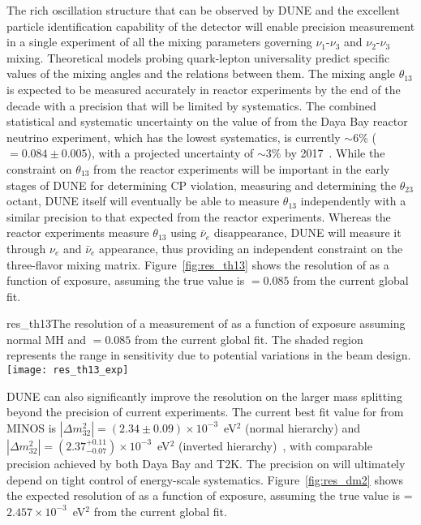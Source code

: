 The rich oscillation structure that can be observed by DUNE and the
excellent particle identification capability of the detector
will enable precision measurement  in a single experiment of all the mixing parameters
governing $\nu_1$-$\nu_3$ and $\nu_2$-$\nu_3$ mixing. Theoretical models probing quark-lepton
universality predict specific values of the mixing angles and the
relations between them. The
mixing angle $\theta_{13}$ is
expected to be measured accurately in reactor experiments by the end
of the decade with a precision that will be limited by
systematics. 
The combined statistical and systematic uncertainty on the value of  
from the Daya Bay reactor neutrino experiment, which has
the lowest systematics, is currently $\sim6$\% ( $= 0.084\pm0.005$),
with a projected uncertainty of $\sim$3\% by 2017~\cite{Zhang:2015fya}.
While the constraint on $\theta_{13}$ from the reactor experiments will be
important in the
early stages of DUNE for determining CP violation, measuring
\deltacp and determining the $\theta_{23}$ octant, 
DUNE itself will eventually be able to measure
$\theta_{13}$ independently with a similar precision to that expected from the reactor experiments. 
Whereas the reactor experiments measure $\theta_{13}$ using $\bar{\nu}_e$
disappearance, DUNE will measure it through $\nu_e$ and
$\bar{\nu}_e$ appearance, thus providing an independent constraint on
the three-flavor mixing matrix.   Figure~\ref{fig:res_th13} shows the resolution of  as a function of exposure, assuming the true value is $ = 0.085$ from the current global fit.

\begin{cdrfigure}{res_th13}{The resolution of a measurement of  as a function of exposure assuming normal MH and $ = 0.085$ from the current global fit. The shaded region represents the range in sensitivity due to potential variations in the beam design.  }
 \texttt{[image: res\_th13\_exp]}
\end{cdrfigure}

DUNE can also significantly improve the
resolution on the larger mass splitting beyond the precision of current experiments.  The current best fit value for 
 from MINOS is $|\Delta m^2_{32}| = (2.34\pm0.09)\times10^{-3}$~eV$^2$ (normal hierarchy) and $|\Delta m^2_{32}| = (2.37^{+0.11}_{-0.07})\times10^{-3}$~eV$^2$ (inverted hierarchy)~\cite{Sousa:2015bxa}, with comparable precision achieved by both Daya Bay and T2K. The
precision on  will ultimately depend on tight control
of energy-scale systematics.  Figure~\ref{fig:res_dm2} shows the expected resolution of  as a function of exposure, assuming the true value is  = $2.457\times10^{-3}$~eV$^2$ from the current global fit.

